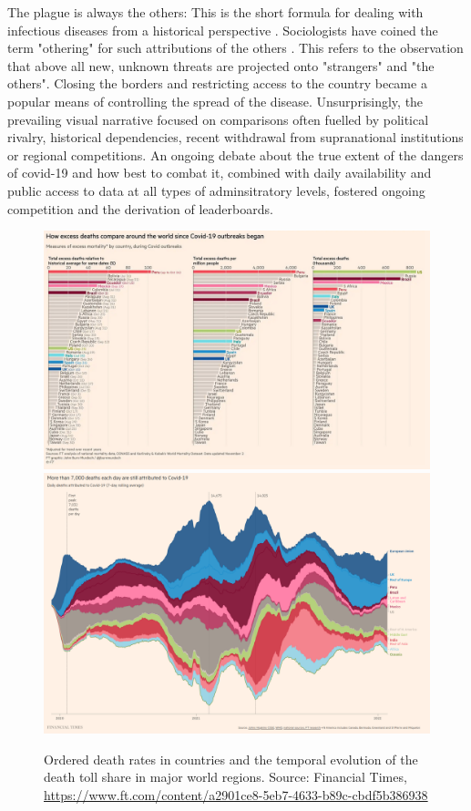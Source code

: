 \documentclass[article]{jdssv}\usepackage[]{graphicx}\usepackage[]{color}
\begin{document}
The plague is always the others: This is the short formula for dealing with infectious diseases from a historical perspective \citep{thiessen2021}. Sociologists have coined the term "othering" for such attributions of the others \citep{mountz2009}. This refers to the observation that above all new, unknown threats are projected onto "strangers" and "the others". Closing the borders and restricting access to the country became a popular means of controlling the spread of the disease. Unsurprisingly, the prevailing visual narrative focused on comparisons often fuelled by political rivalry, historical dependencies, recent withdrawal from supranational institutions or regional competitions. An ongoing debate about the true extent of the dangers of covid-19 and how best to combat it, combined with daily availability and public access to data at all types of adminsitratory levels, fostered ongoing competition and the derivation of leaderboards. 

\begin{figure}\centering
\includegraphics[width=\linewidth]{Figures_Web/ft_deathrates_bar}\\
\includegraphics[width=\linewidth]{Figures_Web/ft_deathcounts_area}
\caption{Ordered death rates in countries and the temporal evolution of the death toll share in major world regions. Source: Financial Times, \url{https://www.ft.com/content/a2901ce8-5eb7-4633-b89c-cbdf5b386938}}
\label{fig:ft-death-ranking}
\end{figure}
\end{document}
